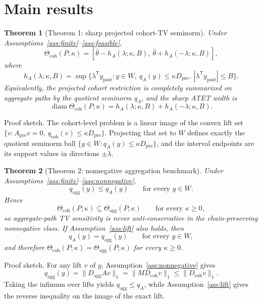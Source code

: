 \documentclass[11pt]{article}
\newcommand{\transpose}{\mathsf{T}}
\theoremstyle{definition}
\theoremstyle{plain}
\newtheorem{theorem}{Theorem}
\theoremstyle{remark}
\begin{document}
\section{Main results}
\begin{theorem}[Theorem 1: sharp projected cohort-TV seminorm]\label{thm:seminorm}
Under Assumptions~\ref{ass:finite}--\ref{ass:feasible},
\[
\Theta_{\mathrm{coh}}(P;\kappa)
=
\left[
\hat\theta-h_A(\lambda;\kappa,B),\
\hat\theta+h_A(-\lambda;\kappa,B)
\right],
\]
where
\[
h_A(\lambda;\kappa,B)
=
\sup\{\lambda^\transpose y_{\mathrm{post}}:
y\in W,\ q_A(y)\le \kappa D_{\mathrm{pre}},\
|\lambda^\transpose y_{\mathrm{post}}|\le B\}.
\]
Equivalently, the projected cohort restriction is completely summarized on aggregate paths by the quotient seminorm \(q_A\), and the sharp ATET width is
\[
\operatorname{diam}\Theta_{\mathrm{coh}}(P;\kappa)
=
h_A(\lambda;\kappa,B)+h_A(-\lambda;\kappa,B).
\]
\end{theorem}
Proof sketch. The cohort-level problem is a linear image of the convex lift set \(\{v:A_{\mathrm{pre}}v=0,\ q_{\mathrm{coh}}(v)\le \kappa D_{\mathrm{pre}}\}\). Projecting that set to \(W\) defines exactly the quotient seminorm ball \(\{y\in W:q_A(y)\le \kappa D_{\mathrm{pre}}\}\), and the interval endpoints are its support values in directions \(\pm\lambda\).

\begin{theorem}[Theorem 2: nonnegative aggregation benchmark]\label{thm:benchmark}
Under Assumptions~\ref{ass:finite}--\ref{ass:nonnegative},
\[
q_{\mathrm{agg}}(y)\le q_A(y)\qquad\text{for every } y\in W.
\]
Hence
\[
\Theta_{\mathrm{coh}}(P;\kappa)\subseteq \Theta_{\mathrm{agg}}(P;\kappa)
\qquad\text{for every }\kappa\ge 0,
\]
so aggregate-path TV sensitivity is never anti-conservative in the chain-preserving nonnegative class. If Assumption~\ref{ass:lift} also holds, then
\[
q_A(y)=q_{\mathrm{agg}}(y)\qquad\text{for every } y\in W,
\]
and therefore \(\Theta_{\mathrm{coh}}(P;\kappa)=\Theta_{\mathrm{agg}}(P;\kappa)\) for every \(\kappa\ge 0\).
\end{theorem}
Proof sketch. For any lift \(v\) of \(y\), Assumption~\ref{ass:nonnegative} gives
\[
q_{\mathrm{agg}}(y)=\|D_{\mathrm{agg}}Av\|_1=\|M D_{\mathrm{coh}}v\|_1\le \|D_{\mathrm{coh}}v\|_1.
\]
Taking the infimum over lifts yields \(q_{\mathrm{agg}}\le q_A\), while Assumption~\ref{ass:lift} gives the reverse inequality on the image of the exact lift.
\end{document}
